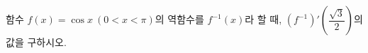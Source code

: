 함수 $f(x)=\cos x\ (0<x<\pi)$의 역함수를 $f^{-1}(x)$라 할 때, $(f^{-1})'\left(\dfrac{\sqrt{3}}{2}\right)$의 값을 구하시오.
